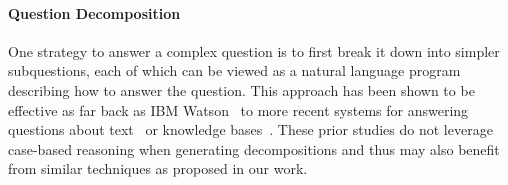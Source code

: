 \documentclass[11pt]{article}
\begin{document}
\paragraph{\textbf{Question Decomposition}}
One strategy to answer a complex question is to first break it down into simpler subquestions, each of which can be viewed as a natural language program describing how to answer the question.
This approach has been shown to be effective as far back as IBM Watson~\cite{ferrucci2010building} to more recent systems for answering questions about text~\cite{das2019multi,min-etal-2019-multi,perez-etal-2020-unsupervised,wolfson2020break} or knowledge bases~\cite{Talmor2018TheWA}.
These prior studies do not leverage case-based reasoning when generating decompositions and thus may also benefit from similar techniques as proposed in our work.
\end{document}
